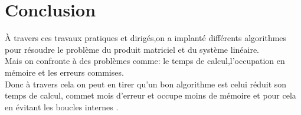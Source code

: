 \documentclass[]{article}
\begin{document}
\section{Conclusion}
À travers ces travaux pratiques et dirigés,on a implanté différents algorithmes pour résoudre le problème du produit matriciel et du système linéaire.\\
Mais on confronte à des problèmes comme: le temps de calcul,l'occupation en mémoire et les erreurs commises.\\
Donc à travers cela on peut en tirer qu'un bon algorithme est celui réduit son temps de calcul, commet mois d'erreur et occupe moins de mémoire et pour cela en évitant les boucles internes .
\end{document}
